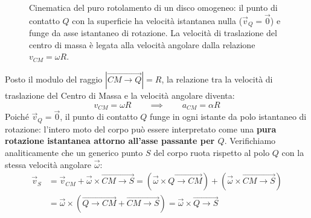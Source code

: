 \begin{figure}[ht]
\centering
{}
\caption{Cinematica del puro rotolamento di un disco omogeneo: il punto di contatto $Q$ con la superficie ha velocità istantanea nulla ($\vec{v}_Q = \vec{0}$) e funge da asse istantaneo di rotazione. La velocità di traslazione del centro di massa è legata alla velocità angolare dalla relazione $v_{CM} = \omega R$.}
\end{figure}

Posto il modulo del raggio $|\overrightarrow{CM \to Q}| = R$, la relazione tra la velocità di traslazione del Centro di Massa e la velocità angolare diventa:
\begin{equation}
    v_{CM} = \omega R \qquad \implies \qquad a_{CM} = \alpha R
\end{equation}
Poiché $\vec{v}_Q = \vec{0}$, il punto di contatto $Q$ funge in ogni istante da polo istantaneo di rotazione: l'intero moto del corpo può essere interpretato come una \textbf{pura rotazione istantanea attorno all'asse passante per $Q$}. Verifichiamo analiticamente che un generico punto $S$ del corpo ruota rispetto al polo $Q$ con la stessa velocità angolare $\vec{\omega}$:
\begin{align*}
    \vec{v}_S &= \vec{v}_{CM} + \vec{\omega} \times \overrightarrow{CM \to S} = (\vec{\omega} \times \overrightarrow{Q \to CM}) + (\vec{\omega} \times \overrightarrow{CM \to S}) \\
    &= \vec{\omega} \times (\overrightarrow{Q \to CM} + \overrightarrow{CM \to S}) = \vec{\omega} \times \overrightarrow{Q \to S}
\end{align*}

